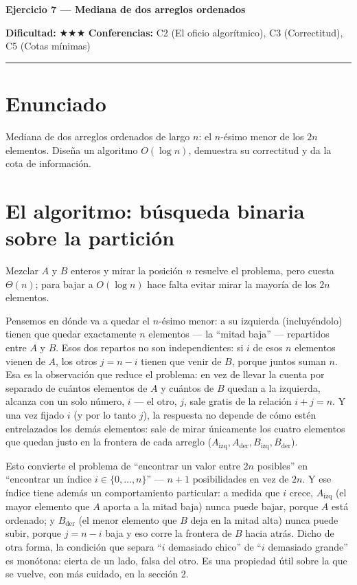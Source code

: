 \documentclass[11pt]{article}
\begin{document}
{\LARGE\bfseries\color{azultitulo} Ejercicio 7 --- Mediana de dos arreglos ordenados}

\vspace{2pt}
\textbf{Dificultad:} $\bigstar\bigstar\bigstar$ \quad \textbf{Conferencias:} C2 (El oficio algorítmico),
C3 (Correctitud), C5 (Cotas mínimas)
\vspace{8pt}
\hrule
\vspace{12pt}

\section*{Enunciado}
\begin{enunciado}
Mediana de dos arreglos ordenados de largo $n$: el $n$-ésimo menor de los $2n$ elementos. Diseña un
algoritmo $O(\log n)$, demuestra su correctitud y da la cota de información.
\end{enunciado}

\section{El algoritmo: búsqueda binaria sobre la partición}

Mezclar $A$ y $B$ enteros y mirar la posición $n$ resuelve el problema, pero cuesta $\Theta(n)$; para bajar a
$O(\log n)$ hace falta evitar mirar la mayoría de los $2n$ elementos.

Pensemos en dónde va a quedar el $n$-ésimo menor: a su izquierda (incluyéndolo) tienen que quedar
exactamente $n$ elementos --- la ``mitad baja'' --- repartidos entre $A$ y $B$. Esos dos repartos no son
independientes: si $i$ de esos $n$ elementos vienen de $A$, los otros $j=n-i$ tienen que venir de $B$,
porque juntos suman $n$. Esa es la observación que reduce el problema: en vez de llevar la cuenta por
separado de cuántos elementos de $A$ y cuántos de $B$ quedan a la izquierda, alcanza con un solo número,
$i$ --- el otro, $j$, sale gratis de la relación $i+j=n$. Y una vez fijado $i$ (y por lo tanto $j$), la
respuesta no depende de cómo estén entrelazados los demás elementos: sale de mirar únicamente los cuatro
elementos que quedan justo en la frontera de cada arreglo ($A_{\mathrm{izq}}, A_{\mathrm{der}},
B_{\mathrm{izq}}, B_{\mathrm{der}}$).

Esto convierte el problema de ``encontrar un valor entre $2n$ posibles'' en ``encontrar un índice
$i\in\{0,\dots,n\}$'' --- $n+1$ posibilidades en vez de $2n$. Y ese índice tiene además un comportamiento
particular: a medida que $i$ crece, $A_{\mathrm{izq}}$ (el mayor elemento que $A$ aporta a la mitad baja)
nunca puede bajar, porque $A$ está ordenado; y $B_{\mathrm{der}}$ (el menor elemento que $B$ deja en la
mitad alta) nunca puede subir, porque $j=n-i$ baja y eso corre la frontera de $B$ hacia atrás. Dicho de otra
forma, la condición que separa ``$i$ demasiado chico'' de ``$i$ demasiado grande'' es monótona: cierta de
un lado, falsa del otro. Es una propiedad útil sobre la que se vuelve, con más cuidado, en la sección 2.
\end{document}
